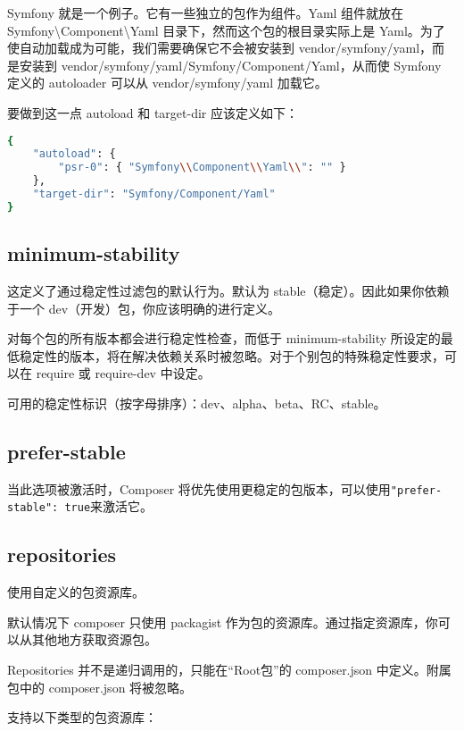Symfony 就是一个例子。它有一些独立的包作为组件。Yaml 组件就放在 Symfony\textbackslash Component\textbackslash Yaml 目录下，然而这个包的根目录实际上是 Yaml。为了使自动加载成为可能，我们需要确保它不会被安装到 vendor/symfony/yaml，而是安装到 vendor/symfony/yaml/Symfony/Component/Yaml，从而使 Symfony 定义的 autoloader 可以从 vendor/symfony/yaml 加载它。

要做到这一点 autoload 和 target-dir 应该定义如下：

\begin{lstlisting}[language=bash]
{
    "autoload": {
        "psr-0": { "Symfony\\Component\\Yaml\\": "" }
    },
    "target-dir": "Symfony/Component/Yaml"
}
\end{lstlisting}

\subsection{minimum-stability}


这定义了通过稳定性过滤包的默认行为。默认为 stable（稳定）。因此如果你依赖于一个 dev（开发）包，你应该明确的进行定义。

对每个包的所有版本都会进行稳定性检查，而低于 minimum-stability 所设定的最低稳定性的版本，将在解决依赖关系时被忽略。对于个别包的特殊稳定性要求，可以在 require 或 require-dev 中设定。

可用的稳定性标识（按字母排序）：dev、alpha、beta、RC、stable。

\subsection{prefer-stable}

当此选项被激活时，Composer 将优先使用更稳定的包版本，可以使用\texttt{"prefer-stable": true}来激活它。

\subsection{repositories}

使用自定义的包资源库。

默认情况下 composer 只使用 packagist 作为包的资源库。通过指定资源库，你可以从其他地方获取资源包。

Repositories 并不是递归调用的，只能在“Root包”的 composer.json 中定义。附属包中的 composer.json 将被忽略。

支持以下类型的包资源库：

